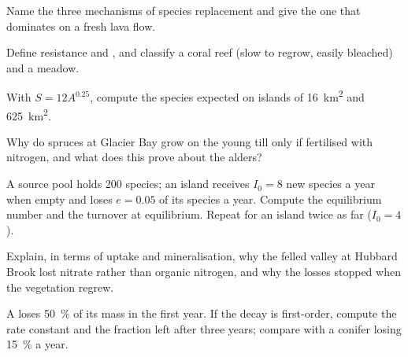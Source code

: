 \begin{exercise}[$\star$]\label{exo:b1:ecosystem-dynamics:2}
Name the three mechanisms of species replacement and give the one
that dominates on a fresh lava flow.
\end{exercise}

\begin{exercise}[$\star$]\label{exo:b1:ecosystem-dynamics:3}
Define resistance and , and classify a coral reef (slow to
regrow, easily bleached) and a meadow.
\end{exercise}

\begin{exercise}[$\star$]\label{exo:b1:ecosystem-dynamics:4}
With $S = 12 A^{0.25}$, compute the species expected on islands of
\qty{16}{km^2} and \qty{625}{km^2}.
\end{exercise}

\begin{exercise}[$\star\star$]\label{exo:b1:ecosystem-dynamics:5}
Why do spruces at Glacier Bay grow on the young till only if
fertilised with nitrogen, and what does this prove about the alders?
\end{exercise}

\begin{exercise}[$\star\star$]\label{exo:b1:ecosystem-dynamics:6}
A source pool holds 200 species; an island receives $I_0 = 8$ new
species a year when empty and loses $e = 0.05$ of its species a year.
Compute the equilibrium number and the turnover at equilibrium.
Repeat for an island twice as far ($I_0 = 4$).
\end{exercise}

\begin{exercise}[$\star\star$]\label{exo:b1:ecosystem-dynamics:7}
Explain, in terms of uptake and mineralisation, why the felled
valley at Hubbard Brook lost nitrate rather than organic nitrogen,
and why the losses stopped when the vegetation regrew.
\end{exercise}

\begin{exercise}[$\star\star$]\label{exo:b1:ecosystem-dynamics:8}
A   loses \qty{50}{\%} of its mass in the first year. If the
decay is first-order, compute the rate constant and the fraction
left after three years; compare with a conifer  losing
\qty{15}{\%} a year.
\end{exercise}

